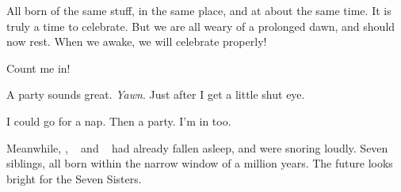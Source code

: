 \documentclass[main.tex]{subfiles}
\begin{document}
\par \Maia All born of the same stuff, in the same place, and at about the same time.  It is truly a time to celebrate.  But we are all weary of a prolonged dawn, and should now rest.  When we awake, we will celebrate properly!

\par \Merope  Count me in!  

\par \Electra A party sounds great. \textit{Yawn}. Just after I get a little shut eye.

\par \Sterope I could go for a nap. Then a party.  I'm in too.

\par \nar Meanwhile, \rmtaygete, \rmalcyone~ and \rmcelaeno~ had already fallen asleep, and were snoring loudly.  Seven siblings, all born within the narrow window of a million years.  The future looks bright for the Seven Sisters.
\end{document}
